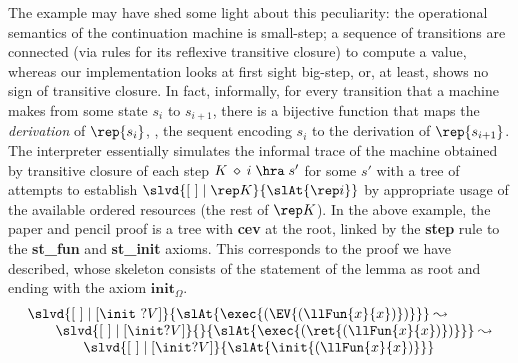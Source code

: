 \documentclass[final]{svjour3}
\begin{document}
The example may have shed some light about this peculiarity:
the operational semantics of the continuation machine is small-step; 
a sequence of transitions are connected (via rules for its reflexive
transitive closure) to compute a value, whereas our implementation
looks at first sight big-step, or, at least, shows no sign of
transitive closure.  In fact, informally, for every transition that a
machine makes from some state $s_i$ to $s_{i+1}$, there is a bijective
function that maps the \emph{derivation} of $\rep{s_i}$,
\ie, the sequent encoding $s_i$ to the derivation of $\rep
{s_{i+1}}$.  The \ollim interpreter essentially simulates the informal
trace of the machine obtained by transitive closure of each step $
K\:\diamond\: i \;\hra\;s'$ for some $s'$ with a tree
of attempts to establish $\slvd {\elist\coln\rep K}{\slAt{\rep i}}$ by
appropriate usage of the available ordered resources (the rest of
$\rep K$). In the above example, the paper and pencil proof is a tree
with \textbf{cev} at the root,  linked by the \textbf{step} rule to the
\textbf{st\_fun} and \textbf{st\_init} axioms. This corresponds to the
\ollim proof we have described, whose skeleton consists of the
statement of the lemma as root and ending with the axiom
$\mathbf{init}_\Omega$.
\[
\begin{array}{l}
 \slvd {\elist\coln [\init \ ?V]} {\slAt{\exec {(\EV
        {(\llFun{x}{x})})}}}\leadsto \\
\qquad \slvd {\elist\coln[\init ?V]}{} {\slAt{\exec {(\ret
       {(\llFun{x}{x})})}}}\leadsto \\
\qquad\qquad \slvd {\elist\coln[\init ?V]} {\slAt{\init {(\llFun{x}{x})}}}
\end{array}
\]
\end{document}
